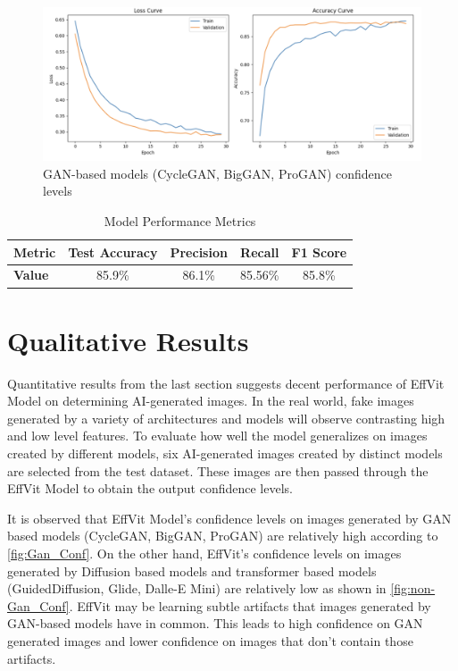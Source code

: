 \documentclass{article} %
\begin{document}
\begin{figure}[h]
    \begin{center}
        \includegraphics[scale=0.27]{figs/training curves.png}
    \end{center}
    \caption{GAN-based models (CycleGAN, BigGAN, ProGAN) confidence levels}
    \label{fig:Training_Curves}
\end{figure}

\begin{table}[h]
    \centering
    \caption{Model Performance Metrics}
    \label{tab:metrics}
    \begin{tabular}{lcccc}
    \toprule
    \textbf{Metric} & \textbf{Test Accuracy} & \textbf{Precision} & \textbf{Recall} & \textbf{F1 Score} \\
    \midrule
    \textbf{Value}  & 85.9\%                & 86.1\%             & 85.56\%          & 85.8\%           \\
    \bottomrule
    \end{tabular}
    \end{table}
    


\section{Qualitative Results}
Quantitative results from the last section suggests decent performance of EffVit Model on determining AI-generated images. In the real world, fake images generated by a variety of architectures and models will observe contrasting high and low level features. To evaluate how well the model generalizes on images created by different models, six AI-generated images created by distinct models are selected from the test dataset. These images are then passed through the EffVit Model to obtain the output confidence levels.

It is observed that EffVit Model's confidence levels on images generated by GAN based models (CycleGAN, BigGAN, ProGAN) are relatively high according to \ref{fig:Gan_Conf}. On the other hand, EffVit's confidence levels on images generated by Diffusion based models and transformer based models (GuidedDiffusion, Glide, Dalle-E Mini) are relatively low as shown in \ref{fig:non-Gan_Conf}. EffVit may be learning subtle artifacts that images generated by GAN-based models have in common. This leads to high confidence on GAN generated images and lower confidence on images that don't contain those artifacts.
\end{document}

